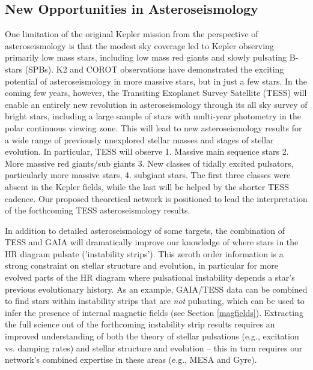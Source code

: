\subsection{New Opportunities in Asteroseismology}

One limitation of the original Kepler mission from the perspective of asteroseismology is that the modest sky coverage led to Kepler observing primarily low mass stars, including low mass red giants and slowly pulsating B-stars (SPBs).  K2 and COROT observations have demonstrated the exciting potential of asteroseismology in more massive stars, but in just a few stars.   In the coming few years, however, the Transiting Exoplanet Survey Satellite (TESS) will enable an entirely new revolution in asteroseismology through its all sky survey of bright stars, including a large sample of stars with multi-year photometry in the polar continuous viewing zone. This will lead to new asteroseismology results for a wide range of previously unexplored stellar masses and stages of stellar evolution. In particular, TESS will observe 1.  Massive main sequence stars 2. More massive red giants/sub giants {\color{green} 3. New classes of tidally excited pulsators, particularly more massive stars}, 4. subgiant stars. The first three classes were absent in the Kepler fields, while the last will be helped by the shorter TESS cadence. {\color{green} Our proposed theoretical network is positioned to lead the interpretation of the forthcoming TESS asteroseismology results.}

In addition to detailed asteroseismology of some targets, the combination of TESS and GAIA will dramatically improve our knowledge of where stars in the HR diagram pulsate ('instability strips').  This zeroth order information is  a strong constraint on stellar structure and evolution, in particular for more evolved parts of the HR diagram where pulsational instability depends a star's previous evolutionary history. {\color{green} As an example, GAIA/TESS data can be combined to find stars within instability strips that are {\it not} pulsating, which can be used to infer the presence of internal magnetic fields (see Section \ref{magfields}).} Extracting the full science out of the forthcoming instability strip results requires an improved understanding of both the theory of stellar pulsations (e.g., excitation vs. damping rates) and stellar structure and evolution -- this in turn requires our network's combined expertise in these areas (e.g., MESA and Gyre).
